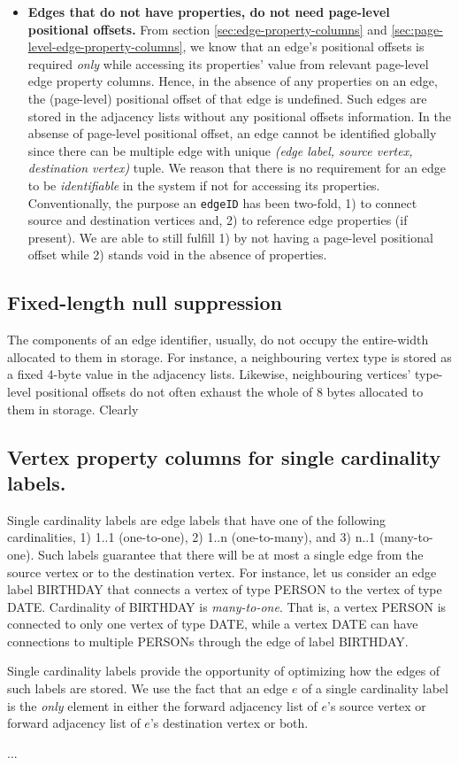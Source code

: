 \begin{itemize}
    \item \textbf{Edges that do not have properties, do not need page-level positional offsets.} From section \ref{sec:edge-property-columns} and \ref{sec:page-level-edge-property-columns}, we know that an edge's positional offsets is required \emph{only} while accessing its properties' value from relevant page-level edge property columns. Hence, in the absence of any properties on an edge, the (page-level) positional offset of that edge is undefined. Such edges are stored in the adjacency lists without any positional offsets information. In the absense of page-level positional offset, an edge cannot be identified globally since there can be multiple edge with unique \emph{(edge label, source vertex, destination vertex)} tuple. We reason that there is no requirement for an edge to be \emph{identifiable} in the system if not for accessing its properties. Conventionally, the purpose an  \texttt{edgeID} has been two-fold, 1) to connect source and destination vertices and, 2) to reference edge properties (if present). We are able to still fulfill 1) by not having a page-level positional offset while 2) stands void in the absence of properties. 
	
\end{itemize}

\subsection{Fixed-length null suppression}

The components of an edge identifier, usually, do not occupy the entire-width allocated to them in storage. For instance, a neighbouring vertex type is stored as a fixed 4-byte value in the adjacency lists. Likewise, neighbouring vertices' type-level positional offsets do not often exhaust the whole of 8 bytes allocated to them in storage. Clearly 


\subsection{Vertex property columns for single cardinality labels.}

Single cardinality labels are edge labels that have one of the following cardinalities, 1) 1..1 (one-to-one), 2) 1..n (one-to-many), and 3) n..1 (many-to-one). Such labels guarantee that there will be at most a single edge from the source vertex or to the destination vertex. For instance, let us consider an edge label BIRTHDAY that connects a vertex of type PERSON to the vertex of type DATE. Cardinality of BIRTHDAY is \emph{many-to-one}. That is, a vertex PERSON is connected to only one vertex of type DATE, while a vertex DATE can have connections to multiple PERSONs through the edge of label BIRTHDAY.

Single cardinality labels provide the opportunity of optimizing how the edges of such labels are stored. We use the fact that an edge $e$ of a single cardinality label is the \emph{only} element in either the forward adjacency list of $e$'s source vertex or forward adjacency list of $e$'s destination vertex or both. 

...
